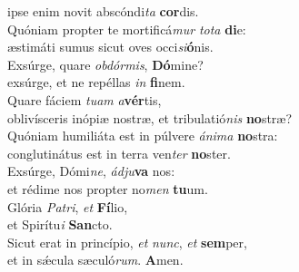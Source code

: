 \oddverse ipse enim novit abscóndi\textit{ta} \textbf{cor}dis.\\
\evenverse Quóniam propter te mortificá\textit{mur} \textit{to}\textit{ta} \textbf{di}e:~\*\\
\evenverse æstimáti sumus sicut oves occi\textit{si}\textbf{ó}nis.\\
\oddverse Exsúrge, quare \textit{ob}\textit{dór}\textit{mis}, \textbf{Dó}mine?~\*\\
\oddverse exsúrge, et ne repéllas \textit{in} \textbf{fi}nem.\\
\evenverse Quare fáciem \textit{tu}\textit{am} \textit{a}\textbf{vér}tis,~\*\\
\evenverse oblivísceris inópiæ nostræ, et tribulatió\textit{nis} \textbf{no}stræ?\\
\oddverse Quóniam humiliáta est in púlvere \textit{á}\textit{ni}\textit{ma} \textbf{no}stra:~\*\\
\oddverse conglutinátus est in terra ven\textit{ter} \textbf{no}ster.\\
\evenverse Exsúrge, Dómi\textit{ne}, \textit{ád}\textit{ju}\textbf{va} nos:~\*\\
\evenverse et rédime nos propter no\textit{men} \textbf{tu}um.\\
\oddverse Glória \textit{Pa}\textit{tri}, \textit{et} \textbf{Fí}lio,~\*\\
\oddverse et Spirítu\textit{i} \textbf{San}cto.\\
\evenverse Sicut erat in princípio, \textit{et} \textit{nunc}, \textit{et} \textbf{sem}per,~\*\\
\evenverse et in sǽcula sæculó\textit{rum}. \textbf{A}men.\\
